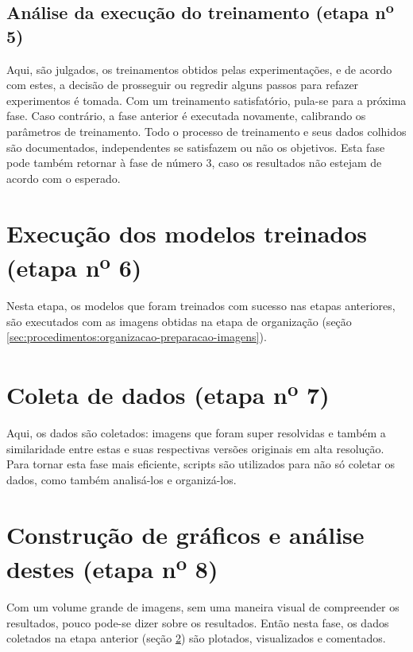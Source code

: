 \subsection{Análise da execução do treinamento (etapa n\textsuperscript{o} 5)}

Aqui, são julgados, os treinamentos obtidos pelas experimentações, e de acordo com estes, a decisão de prosseguir ou regredir alguns passos para refazer experimentos é tomada. Com um treinamento satisfatório, pula-se para a próxima fase. Caso contrário, a fase anterior é executada novamente, calibrando os parâmetros de treinamento. Todo o processo de treinamento e seus dados colhidos são documentados, independentes se satisfazem ou não os objetivos. Esta fase pode também retornar à fase de número 3, caso os resultados não estejam de acordo com o esperado.

\section{Execução dos modelos treinados (etapa n\textsuperscript{o} 6)}
\label{sec:procedimentos:execucao-modelo-treinado}

Nesta etapa, os modelos que foram treinados com sucesso nas etapas anteriores, são executados com as imagens obtidas na etapa de organização (seção \ref{sec:procedimentos:organizacao-preparacao-imagens}).

\section{Coleta de dados (etapa n\textsuperscript{o} 7)}
\label{sec:procedimentos:coleta-dados}

Aqui, os dados são coletados: imagens que foram super resolvidas e também a similaridade entre estas e suas respectivas versões originais em alta resolução. Para tornar esta fase mais eficiente, scripts são utilizados para não só coletar os dados, como também analisá-los e organizá-los.

\section{Construção de gráficos e análise destes (etapa n\textsuperscript{o} 8)}
\label{sec:procedimentos:graficos-analise}

Com um volume grande de imagens, sem uma maneira visual de compreender os resultados, pouco pode-se dizer sobre os resultados. Então nesta fase, os dados coletados na etapa anterior (seção \ref{sec:procedimentos:coleta-dados}) são plotados, visualizados e comentados. 




